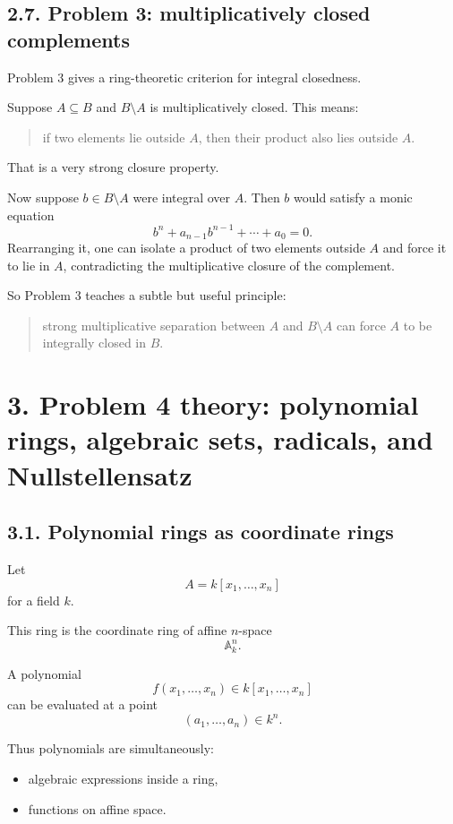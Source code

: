 \documentclass[12pt,a4paper]{article}
\theoremstyle{plain}
\theoremstyle{definition}      %
\begin{document}
\subsection*{2.7. Problem 3: multiplicatively closed complements}

Problem 3 gives a ring-theoretic criterion for integral closedness.

Suppose \(A\subseteq B\) and \(B\setminus A\) is multiplicatively closed. This means:
\begin{quote}
	if two elements lie outside \(A\), then their product also lies outside \(A\).
\end{quote}

That is a very strong closure property.

Now suppose \(b\in B\setminus A\) were integral over \(A\). Then \(b\) would satisfy a monic equation
\[
b^n+a_{n-1}b^{n-1}+\cdots+a_0=0.
\]
Rearranging it, one can isolate a product of two elements outside \(A\) and force it to lie in \(A\), contradicting the multiplicative closure of the complement.

So Problem 3 teaches a subtle but useful principle:
\begin{quote}
	strong multiplicative separation between \(A\) and \(B\setminus A\) can force \(A\) to be integrally closed in \(B\).
\end{quote}

\bigskip

\section*{3. Problem 4 theory: polynomial rings, algebraic sets, radicals, and Nullstellensatz}

\subsection*{3.1. Polynomial rings as coordinate rings}

Let
\[
A=k[x_1,\dots,x_n]
\]
for a field \(k\).

This ring is the coordinate ring of affine \(n\)-space
\[
\mathbb{A}_k^n.
\]

A polynomial
\[
f(x_1,\dots,x_n)\in k[x_1,\dots,x_n]
\]
can be evaluated at a point
\[
(a_1,\dots,a_n)\in k^n.
\]

Thus polynomials are simultaneously:
\begin{itemize}
	\item algebraic expressions inside a ring,
	\item functions on affine space.
\end{itemize}
\end{document}
